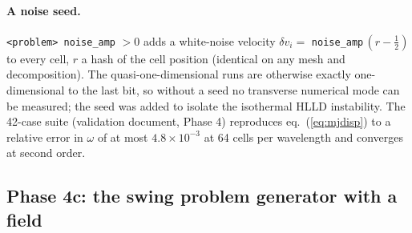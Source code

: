 \documentclass[11pt]{article}
\newcommand{\code}[1]{\texttt{#1}}
\begin{document}
\paragraph{A noise seed.} \code{<problem> noise\_amp} $>0$ adds a white-noise velocity
$\delta v_i = $ \code{noise\_amp}$\,(r - \tfrac12)$ to every cell, $r$ a hash of the cell
position (identical on any mesh and decomposition). The quasi-one-dimensional runs are
otherwise exactly one-dimensional to the last bit, so without a seed no transverse
numerical mode can be measured; the seed was added to isolate the isothermal HLLD
instability. The 42-case suite (validation document, Phase 4) reproduces
eq.~(\ref{eq:mjdisp}) to a relative error in $\omega$ of at most $4.8\times10^{-3}$ at 64
cells per wavelength and converges at second order.

\subsection{Phase 4c: the swing problem generator with a field}
\label{sec:phase4c}
\end{document}
